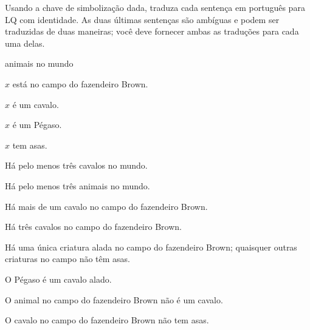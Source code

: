 \problempart Usando a chave de simbolização dada, traduza cada sentença em português para LQ com identidade. As duas últimas sentenças são ambíguas e podem ser traduzidas de duas maneiras; você deve fornecer ambas as traduções para cada uma delas.
\begin{ekey}
\item[UD:] animais no mundo
\item[Bx:] $x$ está no campo do fazendeiro Brown.
\item[Hx:] $x$ é um cavalo.
\item[Px:] $x$ é um Pégaso.
\item[Wx:] $x$ tem asas.
\end{ekey}
\begin{earg}
\item Há pelo menos três cavalos no mundo.
\item Há pelo menos três animais no mundo.
\item Há mais de um cavalo no campo do fazendeiro Brown.
\item Há três cavalos no campo do fazendeiro Brown.
\item Há uma única criatura alada no campo do fazendeiro Brown; quaisquer outras criaturas no campo não têm asas.
\item O Pégaso é um cavalo alado.
\item O animal no campo do fazendeiro Brown não é um cavalo.
\item O cavalo no campo do fazendeiro Brown não tem asas.
\end{earg}
